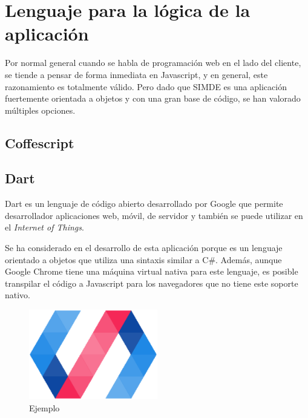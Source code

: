 
\section{Lenguaje para la lógica de la aplicación}
\label{3:sec1}

Por normal general cuando se habla de programación web en el lado del cliente, se tiende a pensar
de forma inmediata en Javascript, y en general, este razonamiento es totalmente válido. Pero dado que SIMDE
es una aplicación fuertemente orientada a objetos y con una gran base de código, se han valorado múltiples opciones.

\subsection{Coffescript}

\subsection{Dart}

Dart es un lenguaje de código abierto desarrollado por Google que permite desarrollador aplicaciones web, móvil, 
de servidor y también se puede utilizar en el \textit{Internet of Things}. 

\bigskip
Se ha considerado en el desarrollo de esta aplicación porque es un lenguaje orientado a objetos que utiliza una 
sintaxis similar a C\#. Además, aunque Google Chrome tiene una máquina virtual nativa para este lenguaje, es posible
transpilar el código a Javascript para los navegadores que no tiene este soporte nativo.

\begin{figure}[!th]
\begin{center}
\includegraphics[width=0.5\textwidth]{images/cap3/polymerlogo.eps}
\caption{Ejemplo}
\label{fig:PolymerLogo}
\end{center}
\end{figure}

